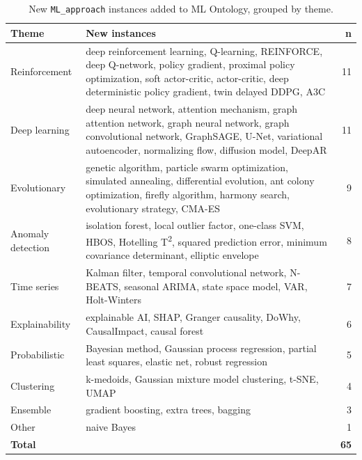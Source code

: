\begin{table}[H]
\centering
\caption[New ML\_approach instances]{New \texttt{ML\_approach} instances added to ML Ontology, grouped by theme.}
\label{tab:new-ml-approaches}
\begin{tabularx}{\textwidth}{lXr}
\toprule
\textbf{Theme} & \textbf{New instances} & \textbf{n} \\
\midrule
Reinforcement
  & deep reinforcement learning, Q-learning, REINFORCE, deep Q-network, policy gradient, proximal policy optimization, soft actor-critic, actor-critic, deep deterministic policy gradient, twin delayed DDPG, A3C & 11 \\
\midrule
Deep learning
  & deep neural network, attention mechanism, graph attention network, graph neural network, graph convolutional network, GraphSAGE, U-Net, variational autoencoder, normalizing flow, diffusion model, DeepAR & 11 \\
\midrule
Evolutionary
  & genetic algorithm, particle swarm optimization, simulated annealing, differential evolution, ant colony optimization, firefly algorithm, harmony search, evolutionary strategy, CMA-ES & 9 \\
\midrule
Anomaly detection
  & isolation forest, local outlier factor, one-class SVM, HBOS, Hotelling T\textsuperscript{2}, squared prediction error, minimum covariance determinant, elliptic envelope & 8 \\
\midrule
Time series
  & Kalman filter, temporal convolutional network, N-BEATS, seasonal ARIMA, state space model, VAR, Holt-Winters & 7 \\
\midrule
Explainability
  & explainable AI, SHAP, Granger causality, DoWhy, CausalImpact, causal forest & 6 \\
\midrule
Probabilistic
  & Bayesian method, Gaussian process regression, partial least squares, elastic net, robust regression & 5 \\
\midrule
Clustering
  & k-medoids, Gaussian mixture model clustering, t-SNE, UMAP & 4 \\
\midrule
Ensemble
  & gradient boosting, extra trees, bagging & 3 \\
\midrule
Other
  & naive Bayes & 1 \\
\midrule
\textbf{Total} & & \textbf{65} \\
\bottomrule
\end{tabularx}
\end{table}



